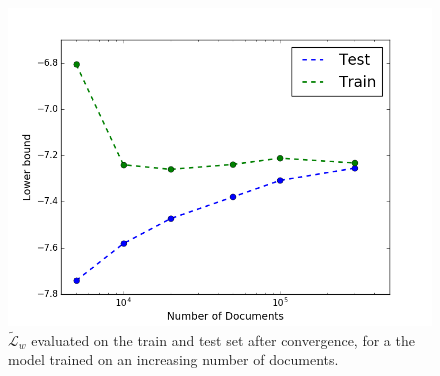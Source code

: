 \documentclass{report}
\begin{document}
	
	\begin{figure}\label{increase}
		\includegraphics[scale=0.6]{img/increase.png}
		\caption{$\tilde{\mathcal{L}}_w$ evaluated on the train and test set after convergence, for a the model trained on an increasing number of documents.}
	\end{figure}
	
\end{document}
